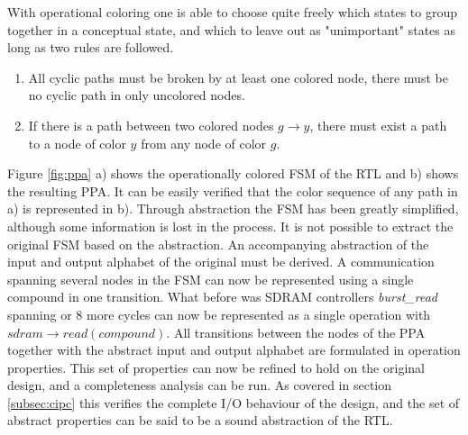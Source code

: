 With operational coloring one is able to choose quite freely which states to group together in a conceptual state, and which to leave out as "unimportant" states as long as two rules are followed. 
\begin{enumerate}
 \item All cyclic paths must be broken by at least one colored node, there must be no cyclic path in only uncolored nodes. 
 \item If there is a path between two colored nodes $g\rightarrow y$, there must exist a path to a node of color $y$ from any node of color $g$. 
\end{enumerate} 

Figure \ref{fig:ppa} a) shows the operationally colored FSM of the RTL and b) shows the resulting PPA. It can be easily verified that the color sequence of any path in a) is represented in b). Through abstraction the FSM has been greatly simplified, although some information is lost in the process. It is not possible to extract the original FSM based on the abstraction. An accompanying abstraction of the input and output alphabet of the original must be derived. A communication spanning several nodes in the FSM can now be represented using a single compound in one transition. What before was SDRAM controllers \textit{burst\_read} spanning or 8 more cycles can now be represented as a single operation with $sdram\rightarrow read(compound)$. All transitions between the nodes of the PPA together with the abstract input and output alphabet are formulated in operation properties. This set of properties can now be refined to hold on the original design, and a completeness analysis can be run. As covered in section \ref{subsec:cipc} this verifies the complete I/O behaviour of the design, and the set of abstract properties can be said to be a sound abstraction of the RTL.  




